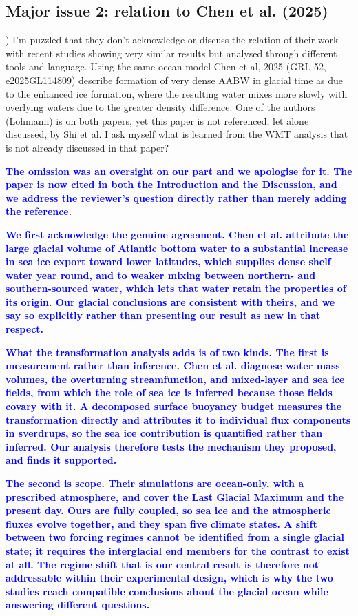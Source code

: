 \documentclass[pdflatex,sn-nature]{sn-jnl}
\begin{document}
\subsection*{Major issue 2: relation to Chen et al. (2025)}

\medskip
{}) I'm puzzled that they don't acknowledge or discuss the relation of their work with recent studies showing very similar results but analysed through different tools and language. Using the same ocean model Chen et al, 2025 (GRL 52, e2025GL114809) describe formation of very dense AABW in glacial time as due to the enhanced ice formation, where the resulting water mixes more slowly with overlying waters due to the greater density difference. One of the authors (Lohmann) is on both papers, yet this paper is not referenced, let alone discussed, by Shi et al. I ask myself what is learned from the WMT analysis that is not already discussed in that paper?
\medskip

\noindent\textcolor{blue}{\textbf{The omission was an oversight on our part and we apologise for it. The paper is now cited in both the Introduction and the Discussion, and we address the reviewer's question directly rather than merely adding the reference.}}


\noindent\textcolor{blue}{\textbf{We first acknowledge the genuine agreement. Chen et al. attribute the large glacial volume of Atlantic bottom water to a substantial increase in sea ice export toward lower latitudes, which supplies dense shelf water year round, and to weaker mixing between northern- and southern-sourced water, which lets that water retain the properties of its origin. Our glacial conclusions are consistent with theirs, and we say so explicitly rather than presenting our result as new in that respect.}}


\noindent\textcolor{blue}{\textbf{What the transformation analysis adds is of two kinds. The first is measurement rather than inference. Chen et al. diagnose water mass volumes, the overturning streamfunction, and mixed-layer and sea ice fields, from which the role of sea ice is inferred because those fields covary with it. A decomposed surface buoyancy budget measures the transformation directly and attributes it to individual flux components in sverdrups, so the sea ice contribution is quantified rather than inferred. Our analysis therefore tests the mechanism they proposed, and finds it supported.}}


\noindent\textcolor{blue}{\textbf{The second is scope. Their simulations are ocean-only, with a prescribed atmosphere, and cover the Last Glacial Maximum and the present day. Ours are fully coupled, so sea ice and the atmospheric fluxes evolve together, and they span five climate states. A shift between two forcing regimes cannot be identified from a single glacial state; it requires the interglacial end members for the contrast to exist at all. The regime shift that is our central result is therefore not addressable within their experimental design, which is why the two studies reach compatible conclusions about the glacial ocean while answering different questions.}}
\end{document}
